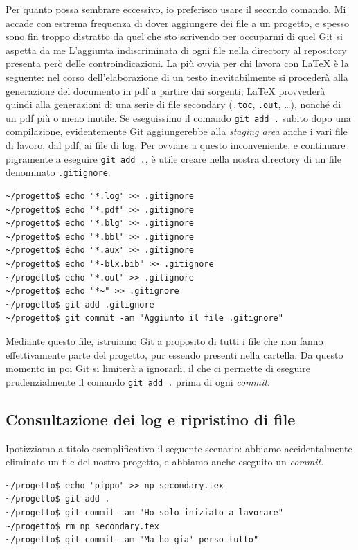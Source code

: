 \documentclass[a4paper,12pt,oneside]{article}
\begin{document}
Per quanto possa sembrare eccessivo, io preferisco usare il secondo comando.
Mi accade con estrema frequenza di
dover aggiungere dei file a un progetto, e spesso sono fin troppo
distratto da quel che sto scrivendo per occuparmi di quel Git si aspetta da me
L'aggiunta indiscriminata di ogni file nella directory al repository presenta
però delle controindicazioni.
La più ovvia per chi lavora con \LaTeX{} è la seguente:
nel corso dell'elaborazione di un testo inevitabilmente si
procederà alla generazione del documento in pdf a partire dai sorgenti;
\LaTeX{} provvederà quindi alla generazioni di una serie di file secondary
(\lstinline|.toc|, \lstinline|.out|, \dots), nonché di un pdf più o meno inutile.
Se eseguissimo il comando \lstinline|git add .| subito dopo una compilazione,
evidentemente Git aggiungerebbe alla \emph{staging area} anche i vari file di
lavoro, dal pdf, ai file  di log. Per ovviare a questo inconveniente, e continuare
pigramente a eseguire \lstinline|git add .|, è utile creare nella nostra
directory di un file denominato \lstinline|.gitignore|.
\begin{lstlisting}
~/progetto$ echo "*.log" >> .gitignore
~/progetto$ echo "*.pdf" >> .gitignore
~/progetto$ echo "*.blg" >> .gitignore
~/progetto$ echo "*.bbl" >> .gitignore
~/progetto$ echo "*.aux" >> .gitignore
~/progetto$ echo "*-blx.bib" >> .gitignore
~/progetto$ echo "*.out" >> .gitignore
~/progetto$ echo "*~" >> .gitignore
~/progetto$ git add .gitignore
~/progetto$ git commit -am "Aggiunto il file .gitignore"
\end{lstlisting}

Mediante questo file, istruiamo Git a proposito di tutti i file che non fanno
effettivamente parte del progetto, pur essendo presenti nella cartella.
Da questo momento in poi Git si limiterà a ignorarli, il che ci permette di
eseguire prudenzialmente il comando \lstinline|git add .| prima di ogni
\emph{commit}.

\subsection{Consultazione dei log e ripristino di file}
Ipotizziamo a titolo esemplificativo il seguente scenario:
abbiamo accidentalmente eliminato un file del nostro
progetto, e abbiamo anche eseguito un \emph{commit}.
\begin{lstlisting}
~/progetto$ echo "pippo" >> np_secondary.tex
~/progetto$ git add .
~/progetto$ git commit -am "Ho solo iniziato a lavorare"
~/progetto$ rm np_secondary.tex
~/progetto$ git commit -am "Ma ho gia' perso tutto"
\end{lstlisting}
\end{document}
